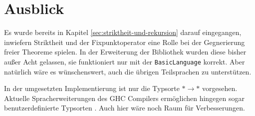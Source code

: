 \section{Ausblick}

Es wurde bereits in Kapitel \ref{sec:striktheit-und-rekursion} darauf eingegangen, inwiefern Striktheit und der Fixpunktoperator
eine Rolle bei der Gegnerierung freier Theoreme spielen. In der Erweiterung der Bibliothek wurden diese bisher außer Acht gelassen,
sie funktioniert nur mit der \texttt{BasicLanguage} korrekt. Aber natürlich wäre es wünschenswert, auch die übrigen
Teilsprachen zu unterstützen.


In der umgesetzten Implementierung ist nur die Typsorte $* \rightarrow *$ vorgesehen. Aktuelle Spracherweiterungen des
GHC Compilers ermöglichen hingegen sogar benutzerdefinierte Typsorten \cite{yorgey} \cite{atkey} . Auch
hier wäre noch Raum für Verbesserungen.